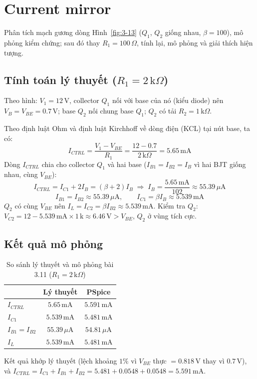 \section{Current mirror}
Phân tích mạch gương dòng Hình~\ref{fig:3-13} ($Q_1$, $Q_2$ giống nhau, $\beta = 100$), mô phỏng kiểm chứng; sau đó thay $R_1 = 100\,\Omega$, tính lại, mô phỏng và giải thích hiện tượng.


\subsection{\texorpdfstring{Tính toán lý thuyết ($R_1 = 2\,\text{k}\Omega$)}{Tính toán lý thuyết (R1 = 2 kOhm)}}
Theo hình: $V_1 = 12\,\text{V}$, collector $Q_1$ nối với base của nó (kiểu diode) nên $V_B = V_{BE} = 0.7\,\text{V}$; base $Q_2$ nối chung base $Q_1$; $Q_2$ có tải $R_2 = 1\,\text{k}\Omega$.

Theo định luật Ohm và định luật Kirchhoff về dòng điện (KCL) tại nút base, ta có:
\[ I_{CTRL} = \frac{V_1 - V_{BE}}{R_1} = \frac{12 - 0.7}{2\,\text{k}\Omega} = 5.65\,\text{mA} \]
Dòng $I_{CTRL}$ chia cho collector $Q_1$ và hai base ($I_{B1} = I_{B2} = I_B$ vì hai BJT giống nhau, cùng $V_{BE}$):
\[ I_{CTRL} = I_{C1} + 2I_B = (\beta + 2) I_B \;\Rightarrow\; I_B = \frac{5.65\,\text{mA}}{102} \approx 55.39\,\mu\text{A} \]
\[ I_{B1} = I_{B2} \approx 55.39\,\mu\text{A}, \qquad I_{C1} = \beta I_B \approx 5.539\,\text{mA} \]
$Q_2$ có cùng $V_{BE}$ nên $I_L = I_{C2} = \beta I_{B2} \approx 5.539\,\text{mA}$. Kiểm tra $Q_2$: $V_{C2} = 12 - 5.539\,\text{mA}\times 1\,\text{k} \approx 6.46\,\text{V} > V_{BE}$, $Q_2$ ở vùng tích cực.

\subsection{Kết quả mô phỏng}

\begin{table}[H]
\centering
\begin{tabular}{l|c|c}
\toprule
 & Lý thuyết & PSpice \\
\midrule
$I_{CTRL}$ & $5.65\,\text{mA}$ & $5.591\,\text{mA}$ \\
$I_{C1}$ & $5.539\,\text{mA}$ & $5.481\,\text{mA}$ \\
$I_{B1} = I_{B2}$ & $55.39\,\mu\text{A}$ & $54.81\,\mu\text{A}$ \\
$I_L$ & $5.539\,\text{mA}$ & $5.481\,\text{mA}$ \\
\bottomrule
\end{tabular}
\caption{So sánh lý thuyết và mô phỏng bài 3.11 ($R_1 = 2\,\text{k}\Omega$)}
\end{table}
Kết quả khớp lý thuyết (lệch khoảng $1\%$ vì $V_{BE}$ thực $= 0.818\,\text{V}$ thay vì $0.7\,\text{V}$), và $I_{CTRL} = I_{C1} + I_{B1} + I_{B2} = 5.481 + 0.0548 + 0.0548 = 5.591\,\text{mA}$.

